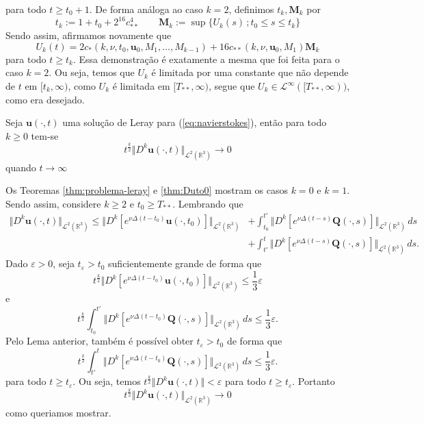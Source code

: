 \documentclass[a4paper, 11pt]{book}
\theoremstyle{definition}
\newcommand{\bR}{\mathbb{R}}
\newcommand{\bu}{\mathbf{u}}
\newcommand{\BQ}{\mathbf{Q}}
\newcommand{\cL}{\mathcal{L}}
\begin{document}
\begin{prf}
\[    \]
    para todo $t \geqslant t_0 + 1$.
    De forma análoga ao caso $k = 2$, definimos $t_k, \mathbf{M}_k$ por
    \[
        t_k := 1 + t_0 + 2^{16}c_{**}^4 \qquad \mathbf{M}_k := \sup \{U_k(s) \,; t_0 \leqslant s \leqslant t_k\}
    \]
    Sendo assim, afirmamos novamente que
    \[
        U_k(t) = 2c_*(k,\nu,t_0,\bu_0,M_1,\dots,M_{k-1}) + 16 c_{**} (k,\nu,\bu_0,M_1) \mathbf{M}_k
    \]
    para todo $t \geqslant t_k$.
    Essa demonstração é exatamente a mesma que foi feita para o caso $k = 2$.
    Ou seja, temos que $U_k$ é limitada por uma constante que não depende de $t$ em $[t_k,\infty)$, como $U_k$ é limitada em $[T_{**}, \infty)$, segue que $U_k \in \cL^\infty([T_{**}, \infty))$, como era desejado.
\end{prf}

\begin{tbox}
    Seja $\bu(\cdot,t)$ uma solução de Leray para (\ref{eq:navierstokes}), então para todo $k \geqslant 0$ tem-se
    \[
        t^{\frac{k}{2}} \Vert D^k\bu(\cdot,t) \Vert_{\cL^2(\bR^3)} \to 0
    \]
    quando $t \to \infty$
\end{tbox}
\begin{prf}
    Os Teoremas \ref{thm:problema-leray} e \ref{thm:Duto0} mostram os casos $k = 0$ e $k = 1$. Sendo assim, considere $k \geqslant 2$ e $t_0 \geqslant T_{**}$.
    Lembrando que
    \[
        \begin{aligned}
            \Vert D^k \bu(\cdot,t) \Vert_{\cL^2(\bR^3)} \leqslant \Vert D^k[e^{\nu \Delta(t-t_0)} \bu(\cdot,t_0)] \Vert_{\cL^2(\bR^3)} & + \int_{t_0}^{t'} \Vert D^k[e^{\nu \Delta (t-s)} \BQ(\cdot,s)] \Vert_{\cL^2(\bR^3)} \,ds\\
        &+ \int_{t'}^{t} \Vert D^k[e^{\nu \Delta (t-s)} \BQ(\cdot,s)] \Vert_{\cL^2(\bR^3)} \,ds.
        \end{aligned}
    \]
    Dado $\varepsilon > 0$, seja $t_\varepsilon > t_0$ suficientemente grande de forma que
    \[
        t^{\frac{k}{2}} \Vert D^k [e^{\nu \Delta (t-t_0)} \bu(\cdot,t_0)] \Vert_{\cL^2(\bR^3)} \leqslant \frac{1}{3} \varepsilon
    \]
    e
    \[
        t^{\frac{k}{2}} \int_{t_0}^{t'} \Vert D^k [e^{\nu \Delta (t-t_0)} \BQ(\cdot,s)] \Vert_{\cL^2(\bR^3)} \,ds \leqslant \frac{1}{3} \varepsilon.
    \]
    Pelo Lema anterior, também é possível obter $t_\varepsilon > t_0$ de forma que
    \[
        t^{\frac{k}{2}} \int_{t'}^{t} \Vert D^k [e^{\nu \Delta (t-t_0)} \BQ(\cdot,s)] \Vert_{\cL^2(\bR^3)} \,ds \leqslant \frac{1}{3} \varepsilon.
    \]
    para todo $t \geqslant t_\varepsilon$. Ou seja, temos $t^{\frac{k}{2}} \Vert D^k\bu(\cdot,t) \Vert < \varepsilon$ para todo $t \geqslant t_\varepsilon$. Portanto
    \[
        t^{\frac{k}{2}} \Vert D^k\bu(\cdot,t) \Vert_{\cL^2(\bR^3)} \to 0
    \]
    como queriamos mostrar.
\end{prf}
\end{document}
